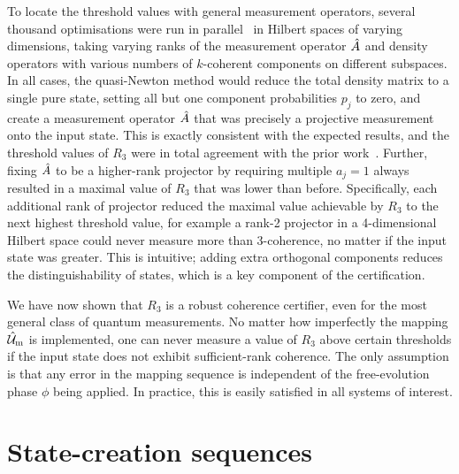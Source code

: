 To locate the threshold values with general measurement operators, several thousand optimisations were run in parallel~\cite{ImperialHPC} in Hilbert spaces of varying dimensions, taking varying ranks of the measurement operator $\hat{A}$ and density operators with various numbers of $k$-coherent components on different subspaces.
In all cases, the quasi-Newton method would reduce the total density matrix to a single pure state, setting all but one component probabilities $p_j$ to zero, and create a measurement operator $\hat{A}$ that was precisely a projective measurement onto the input state.
This is exactly consistent with the expected results, and the threshold values of $R_3$ were in total agreement with the prior work~\cite{Dive2020}.
Further, fixing $\hat{A}$ to be a higher-rank projector by requiring multiple $a_j = 1$ always resulted in a maximal value of $R_3$ that was lower than before.
Specifically, each additional rank of projector reduced the maximal value achievable by $R_3$ to the next highest threshold value, for example a rank-2 projector in a 4-dimensional Hilbert space could never measure more than 3-coherence, no matter if the input state was greater.
This is intuitive; adding extra orthogonal components reduces the distinguishability of states, which is a key component of the certification.

We have now shown that $R_3$ is a robust coherence certifier, even for the most general class of quantum measurements.
No matter how imperfectly the mapping $\hat{\mathcal U}_{\text m}$ is implemented, one can never measure a value of $R_3$ above certain thresholds if the input state does not exhibit sufficient-rank coherence.
The only assumption is that any error in the mapping sequence is independent of the free-evolution phase $\phi$ being applied.
In practice, this is easily satisfied in all systems of interest.


\section{State-creation sequences}
\label{sec:coherence-creation}

